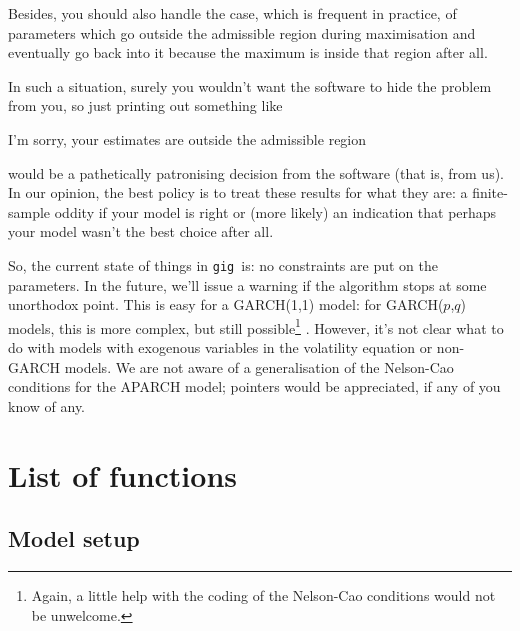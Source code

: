 \documentclass[a4paper,11pt]{article}
\newcommand{\gig}{\texttt{gig}}
\begin{document}
Besides, you should also handle the case, which is frequent in
practice, of parameters which go outside the admissible region during
maximisation and eventually go back into it because the maximum is
inside that region after all.

In such a situation, surely you wouldn't want the software to hide the
problem from you, so just printing out something like 
\begin{code}
  I'm sorry, your estimates are outside the admissible region
\end{code}
would be a pathetically patronising decision from the software (that
is, from us). In our opinion, the best policy is to treat these
results for what they are: a finite-sample oddity if your model is
right or (more likely) an indication that perhaps your model wasn't
the best choice after all.

So, the current state of things in \gig\ is: no constraints are put on
the parameters. In the future, we'll issue a warning if the algorithm
stops at some unorthodox point. This is easy for a GARCH(1,1) model:
for GARCH($p$,$q$) models, this is more complex, but still
possible\footnote{Again, a little help with the coding of the
  Nelson-Cao conditions would not be unwelcome.}
\citep{NelCao92}. However, it's not clear what to do with models with
exogenous variables in the volatility equation or non-GARCH models. We
are not aware of a generalisation of the Nelson-Cao conditions for the
APARCH model; pointers would be appreciated, if any of you know of
any.



\appendix

\section{List of functions}
\label{sec:syntax}
\subsection{Model setup}
\label{sec:gig_setup}
\end{document}
